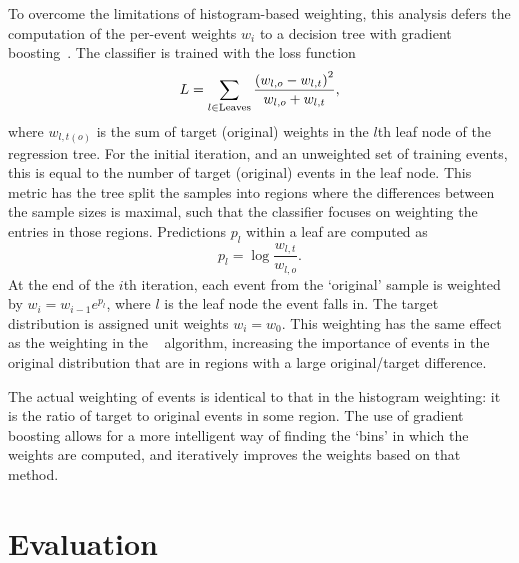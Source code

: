 To overcome the limitations of histogram-based weighting, this analysis defers
the computation of the per-event weights $w_{i}$ to a decision tree with
gradient boosting~\cite{Rogozhnikov:2016bdp}.
The classifier is trained with the loss function
\begin{equation}
  L = \sum_{l \in \text{Leaves}} \frac{%
    {(w_{l,o} - w_{l,t})}^{2}
  }{%
    w_{l,o} + w_{l,t}
  },
\end{equation}
where $w_{l,t(o)}$ is the sum of target (original) weights in the $l$th leaf
node of the regression tree.
For the initial iteration, and an unweighted set of training events, this is
equal to the number of target (original) events in the leaf node.
This metric has the tree split the samples into regions where the differences
between the sample sizes is maximal, such that the classifier focuses on
weighting the entries in those regions.
Predictions $p_{l}$ within a leaf are computed as
\begin{equation}
  p_{l} = \log{\frac{w_{l,t}}{w_{l,o}}}.
\end{equation}
At the end of the $i$th iteration, each event from the `original' sample is
weighted by $w_{i} = w_{i - 1}e^{p_{l}}$, where $l$ is the leaf node the event
falls in.
The target distribution is assigned unit weights $w_{i} = w_{0}$.
This weighting has the same effect as the weighting in the 
\adaboost~\cite{Freund1997119} algorithm, increasing the importance of events 
in the original distribution that are in regions with a large original/target 
difference.

The actual weighting of events is identical to that in the histogram weighting:
it is the ratio of target to original events in some region.
The use of gradient boosting allows for a more intelligent way of finding the
`bins' in which the weights are computed, and iteratively improves the weights
based on that method.

\section{Evaluation}
\label{chap:cpv:kinematic_weighting:evaluation}

